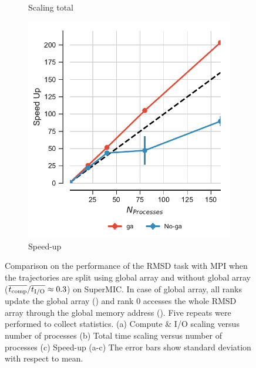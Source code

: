 \begin{figure}[ht!]
\begin{subfigure}{.3\textwidth}
  \caption{Scaling total}
  \label{fig:MPItottime-SuperMIC}
\end{subfigure}
\hfill
\begin{subfigure}{.3\textwidth}
  \includegraphics[width=\linewidth]{figures/Comparison_Speed_UP_traj_splitting-SuperMIC.pdf}
  \caption{Speed-up}
  \label{fig:MPIspeedup-SuperMIC}
\end{subfigure}

\caption{Comparison on the performance of the RMSD task with MPI when the trajectories are split using global array and without global array ($\overline{{t}_{\text{comp}}}/\overline{{t}_{\text{I/O}}} \approx 0.3$) on SuperMIC.
In case of global array, all ranks update the global array () and rank 0 accesses the whole RMSD array through the global memory address ().
Five repeats were performed to collect statistics. (a) Compute \& I/O scaling versus number of processes (b) Total time scaling versus number of processes (c) Speed-up (a-c) The error bars show standard deviation with respect to mean.}
\label{fig:MPIwithIO-split-SuperMIC}
\end{figure}

